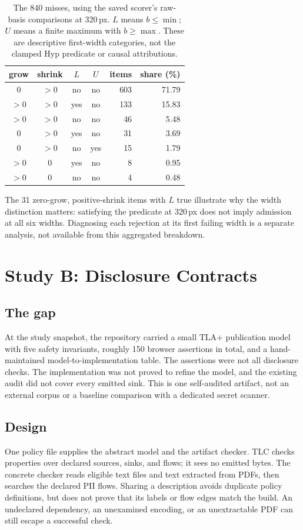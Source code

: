 \documentclass[acmsmall,screen,review,anonymous,nonacm]{acmart}
\begin{document}
\begin{table}[t]
\centering\small
\caption{The 840 misses, using the saved scorer's raw-basis comparisons at 320\,px. $L$ means $b\leq\min$; $U$ means a finite maximum with $b\geq\max$. These are descriptive first-width categories, not the clamped $\mathrm{Hyp}$ predicate or causal attributions.}
\label{tab:misses}
\begin{tabular}{ccccrr}
\toprule
grow & shrink & $L$ & $U$ & items & share (\%) \\
\midrule
$0$ & $>0$ & no & no & 603 & 71.79 \\
$>0$ & $>0$ & yes & no & 133 & 15.83 \\
$>0$ & $>0$ & no & no & 46 & 5.48 \\
$0$ & $>0$ & yes & no & 31 & 3.69 \\
$0$ & $>0$ & no & yes & 15 & 1.79 \\
$>0$ & $0$ & yes & no & 8 & 0.95 \\
$>0$ & $0$ & no & no & 4 & 0.48 \\
\bottomrule
\end{tabular}
\end{table}

The 31 zero-grow, positive-shrink items with $L$ true illustrate why the width distinction matters: satisfying the predicate at 320\,px does not imply admission at all six widths. Diagnosing each rejection at its first failing width is a separate analysis, not available from this aggregated breakdown.

\section{Study B: Disclosure Contracts}

\subsection{The gap}
At the study snapshot, the repository carried a small TLA+ publication model with five safety invariants, roughly 150 browser assertions in total, and a hand-maintained model-to-implementation table. The assertions were not all disclosure checks. The implementation was not proved to refine the model, and the existing audit did not cover every emitted sink. This is one self-audited artifact, not an external corpus or a baseline comparison with a dedicated secret scanner.

\subsection{Design}
One policy file supplies the abstract model and the artifact checker. TLC checks properties over declared sources, sinks, and flows; it sees no emitted bytes. The concrete checker reads eligible text files and text extracted from PDFs, then searches the declared PII flows. Sharing a description avoids duplicate policy definitions, but does not prove that its labels or flow edges match the build. An undeclared dependency, an unexamined encoding, or an unextractable PDF can still escape a successful check.
\end{document}
